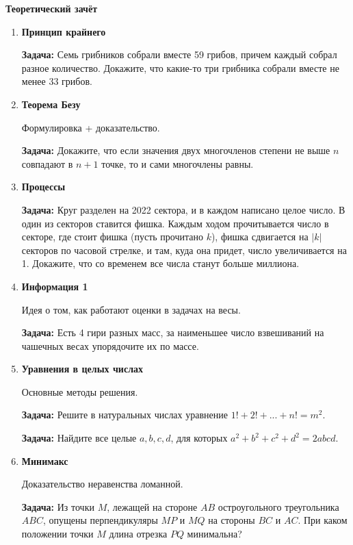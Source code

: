 \documentclass{article}
\begin{document}
\large

\begin{center}
	\textbf{Теоретический зачёт}
\end{center}

\begin{enumerate}[label*=\protect\fbox{\arabic{enumi}}]

\item \textbf{Принцип крайнего}

\textbf{Задача:} Семь грибников собрали вместе 59 грибов, причем каждый собрал разное количество. Докажите, что какие-то три грибника собрали вместе не менее 33 грибов.

\item \textbf{Теорема Безу}

Формулировка + доказательство.

\textbf{Задача:} Докажите, что если значения двух многочленов степени не выше $n$ совпадают в $n+1$ точке, то и сами многочлены равны. 

\item \textbf{Процессы}			

\textbf{Задача:} Круг разделен на 2022 сектора, и в каждом написано целое число. В один из секторов ставится фишка. Каждым ходом прочитывается число в секторе, где стоит фишка (пусть прочитано $k$), фишка сдвигается на $|k|$ секторов по часовой стрелке, и там, куда она придет, число увеличивается на 1. Докажите, что со временем все числа станут больше миллиона.

\item \textbf{Информация 1}

Идея о том, как работают оценки в задачах на весы.


\textbf{Задача:} Есть 4 гири разных масс, за наименьшее число взвешиваний на чашечных весах упорядочите их по массе.


\item \textbf{Уравнения в целых числах	}

Основные методы решения.

\textbf{Задача:} Решите в натуральных числах уравнение   $1! + 2! + ... + n! = m^2$.

\textbf{Задача:} Найдите все целые $a, b, c, d$, для которых $a^2 +b^2 +c^2 +d^2 = 2abcd$.


\item \textbf{Минимакс}	

Доказательство неравенства ломанной.

\textbf{Задача:} Из точки $M$, лежащей на стороне $AB$ остроугольного треугольника $ABC$, опущены перпендикуляры $MP$ и $MQ$ на стороны $BC$ и $AC$. При каком положении точки $M$ длина отрезка $PQ$ минимальна?


\end{enumerate}
\end{document}
